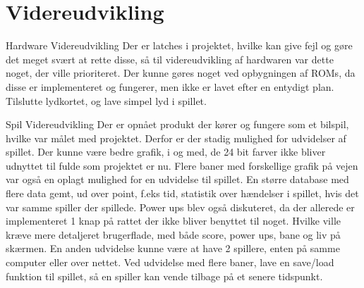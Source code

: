 \section{Videreudvikling}

Hardware Videreudvikling
Der er latches i projektet, hvilke kan give fejl og gøre det meget svært at rette disse, så til videreudvikling af hardwaren var dette noget, der ville prioriteret. Der kunne gøres noget ved opbygningen af ROMs, da disse er implementeret og fungerer, men ikke er lavet efter en entydigt plan.
Tilslutte lydkortet, og lave simpel lyd i spillet.

Spil Videreudvikling
Der er opnået produkt der kører og fungere som et bilspil, hvilke var målet med projektet. Derfor er der stadig mulighed for udvidelser af spillet.
 Der kunne være bedre grafik, i og med, de 24 bit farver ikke bliver udnyttet til fulde som projektet er nu. Flere baner med forskellige grafik på vejen var også en oplagt mulighed for en udvidelse til spillet.
 En større database med flere data gemt, ud over point, f.eks tid, statistik over hændelser i spillet, hvis det var samme spiller der spillede.
 Power ups blev også diskuteret, da der allerede er implementeret 1 knap på rattet der ikke bliver benyttet til noget. Hvilke ville kræve mere detaljeret brugerflade, med både score, power ups, bane og liv på skærmen.
 En anden udvidelse kunne være at have 2 spillere, enten på samme computer eller over nettet.
Ved udvidelse med flere baner, lave en save/load funktion til spillet, så en spiller kan vende tilbage på et senere tidspunkt.
